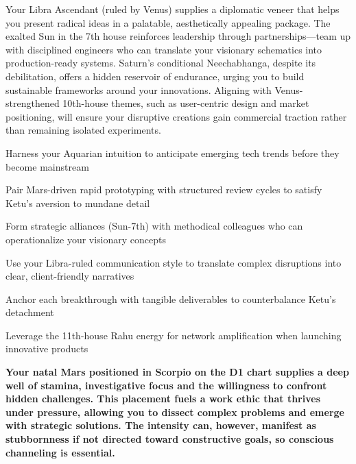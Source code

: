 {\fontsize{9}{13}\selectfont Your Libra Ascendant (ruled by Venus) supplies a diplomatic veneer that helps you present radical ideas in a palatable, aesthetically appealing package. The exalted Sun in the 7th house reinforces leadership through partnerships---team up with disciplined engineers who can translate your visionary schematics into production-ready systems. Saturn's conditional Neechabhanga, despite its debilitation, offers a hidden reservoir of endurance, urging you to build sustainable frameworks around your innovations. Aligning with Venus-strengthened 10th-house themes, such as user-centric design and market positioning, will ensure your disruptive creations gain commercial traction rather than remaining isolated experiments.}\par\vspace{1.8mm}

\begin{diamondlist}
  \item {\fontsize{8.5}{12}\selectfont Harness your Aquarian intuition to anticipate emerging tech trends before they become mainstream}
  \item {\fontsize{8.5}{12}\selectfont Pair Mars-driven rapid prototyping with structured review cycles to satisfy Ketu's aversion to mundane detail}
  \item {\fontsize{8.5}{12}\selectfont Form strategic alliances (Sun-7th) with methodical colleagues who can operationalize your visionary concepts}
  \item {\fontsize{8.5}{12}\selectfont Use your Libra-ruled communication style to translate complex disruptions into clear, client-friendly narratives}
  \item {\fontsize{8.5}{12}\selectfont Anchor each breakthrough with tangible deliverables to counterbalance Ketu's detachment}
  \item {\fontsize{8.5}{12}\selectfont Leverage the 11th-house Rahu energy for network amplification when launching innovative products}
\end{diamondlist}


\label{topic31}

{\fontsize{9.5}{13.8}\selectfont\bfseries\color{DeepSlate} Your natal Mars positioned in Scorpio on the D1 chart supplies a deep well of stamina, investigative focus and the willingness to confront hidden challenges. This placement fuels a work ethic that thrives under pressure, allowing you to dissect complex problems and emerge with strategic solutions. The intensity can, however, manifest as stubbornness if not directed toward constructive goals, so conscious channeling is essential.}\par\vspace{2mm}

